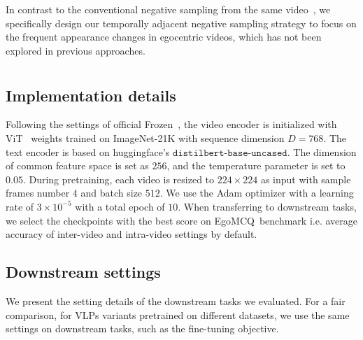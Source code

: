 \documentclass{article}
\newcommand{\eval}{EgoMCQ}
\begin{document}
In contrast to the conventional negative sampling from the same video~\cite{wray2021semantic, lei2021detecting}, 
we specifically design our temporally adjacent negative sampling strategy to focus on the frequent appearance changes in egocentric videos, which has not been explored in previous approaches. \section{\secd}\label{d}
\subsection{Implementation details}
Following the settings of official Frozen~\cite{bain2021frozen}, the video encoder is initialized with ViT~\cite{dosovitskiy2020image} weights trained on ImageNet-21K with sequence dimension $D=768$. 
The text encoder is based on huggingface's $\texttt{distilbert-base-uncased}$.
The dimension of common feature space is set as $256$, and the temperature parameter is set to $0.05$.
During pretraining, each video is resized to $224\times 224$ as input with sample frames number $4$ and batch size $512$.
We use the Adam optimizer with a learning rate of $3\times 10^{-5}$ with a total epoch of $10$. When transferring to downstream tasks, we select the checkpoints with the best score on \eval~benchmark i.e. average accuracy of inter-video and intra-video settings by default.

\subsection{Downstream settings}
We present the setting details of the downstream tasks we evaluated. 
For a fair comparison, for VLPs variants pretrained on different datasets, we use the same settings on downstream tasks, such as the fine-tuning objective.
\end{document}
